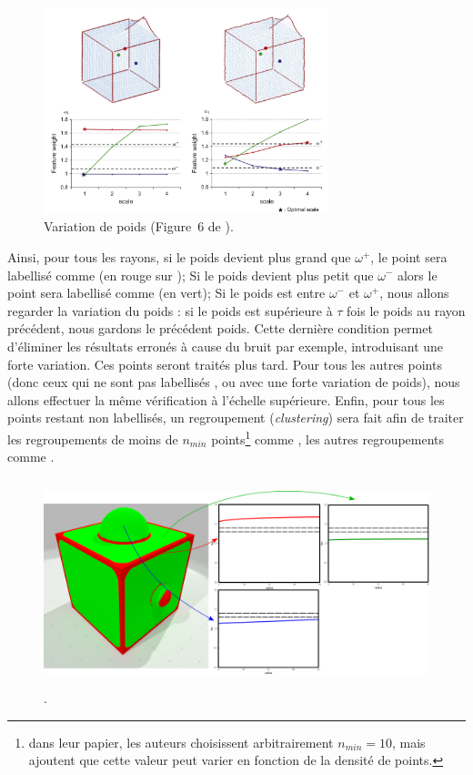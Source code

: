 \begin{figure}[ht]{
    \begin{center}
    \includegraphics[height=6cm]{images/Feature/Tensor_weight}
    \end{center}}
    \caption[Variation de poids.]{Variation de poids (Figure~6 de \cite{Park2012}).
      \label{fig:tensor-weight}}
\end{figure}

Ainsi, pour tous les rayons, si le poids devient plus grand que $\omega^+$, le
point sera labellisé comme \Feature (en rouge sur );
Si le poids devient plus petit que $\omega^-$ alors le point sera
labellisé comme \NonFeature (en vert); Si le poids est entre $\omega^-$ et
$\omega^+$, nous allons regarder la variation du poids : si le poids est
supérieure à $\tau$ fois le poids au rayon précédent, nous gardons le précédent
poids. Cette dernière condition permet d'éliminer les résultats erronés à cause
du bruit par exemple, introduisant une forte variation. Ces points seront
traités plus tard. Pour tous les autres points (donc ceux qui ne sont pas
labellisés \Feature, \NonFeature ou avec une forte variation de poids), nous
allons effectuer la même vérification à l'échelle supérieure. Enfin, pour tous
les points restant non labellisés, un regroupement (\emph{clustering}) sera fait
afin de traiter les regroupements de moins de $n_{min}$ points\footnote{dans
leur papier, les auteurs choisissent arbitrairement $n_{min}=10$, mais ajoutent
que cette valeur peut varier en fonction de la densité de points.} comme
\NonFeature, les autres regroupements comme \Feature.

\begin{figure}[ht]{
  \begin{center}
    \includegraphics[height=6cm]{figures/CubeSpherePlotTensor}
  \end{center}}
    \caption[.]{.
    \label{fig:tensor-cubesphere}}
\end{figure}

